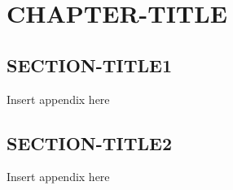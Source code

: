 \newpage
\clearpage
\setcounter{secnumdepth}{3}

\appendix

\chapter{CHAPTER-TITLE}

\section{SECTION-TITLE1}
\label{app:SECTION_TITLE1_lable}
Insert appendix here
\newpage

\section{SECTION-TITLE2}
\label{app:SECTION_TITLE2_lable}
Insert appendix here